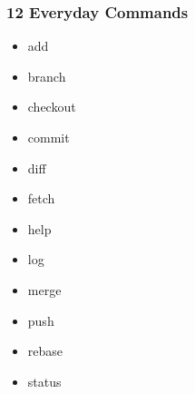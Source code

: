 {\begin{frame}
    \frametitle{12 Everyday Commands}
    \begin{multicols}{3}
        \begin{itemize}
            \setlength\itemsep{3em}
            \item \alert{add}
            \item \alert{branch}
            \item \alert{checkout}
            \item \alert{commit}
            \item \alert{diff}
            \item fetch
            \item \alert{help}
            \item \alert{log}
            \item \alert{merge}
            \item push
            \item rebase
            \item \alert{status}
        \end{itemize}
    \end{multicols}
\end{frame}

}
